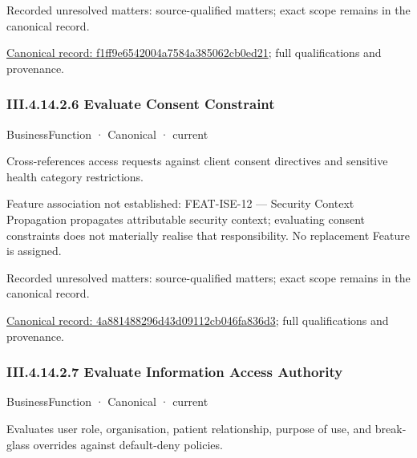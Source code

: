 {\small Recorded unresolved matters: source-qualified matters; exact scope remains in the canonical record.}\par
{\footnotesize \href{../../../../../../../../continuum/business/business-service/f1ff9e6542004a7584a385062cb0ed21.md}{Canonical record: f1ff9e6542004a7584a385062cb0ed21}; full qualifications and provenance.}\par
\subsubsection*{III.4.14.2.6 Evaluate Consent Constraint}
\label{navigation:III.4.14.2.6}

\label{element:4a881488296d43d09112cb046fa836d3}
{\small BusinessFunction · Canonical · current}\par

Cross-references access requests against client consent directives and sensitive health category restrictions.



Feature association not established: FEAT-ISE-12 — Security Context Propagation propagates attributable security context; evaluating consent constraints does not materially realise that responsibility. No replacement Feature is assigned.


{\small Recorded unresolved matters: source-qualified matters; exact scope remains in the canonical record.}\par
{\footnotesize \href{../../../../../../../../continuum/business/business-function/4a881488296d43d09112cb046fa836d3.md}{Canonical record: 4a881488296d43d09112cb046fa836d3}; full qualifications and provenance.}\par
\subsubsection*{III.4.14.2.7 Evaluate Information Access Authority}
\label{navigation:III.4.14.2.7}

\label{element:4707b7fc77254ea68c30fc89f5119a77}
{\small BusinessFunction · Canonical · current}\par

Evaluates user role, organisation, patient relationship, purpose of use, and break-glass overrides against default-deny policies.


